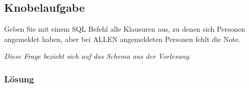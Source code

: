 \subsection{Knobelaufgabe}
\label{sec:uebung_04.aufgabe_10}
Geben Sie mit einem SQL Befehl alle Klausuren aus, zu denen sich Personen angemeldet haben, aber bei ALLEN angemeldeten Personen fehlt die Note.

\textit{Diese Frage bezieht sich auf das Schema aus der Vorlesung.}

\subsubsection*{Lösung}
\label{sec:uebung_04.aufgabe_10.loesung}
